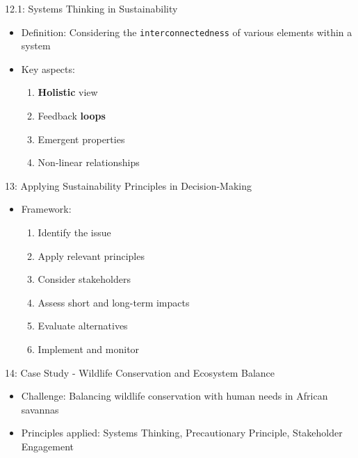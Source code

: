 \documentclass[
  ignorenonframetext,
]{beamer}
\providecommand{\tightlist}{%
  \setlength{\itemsep}{0pt}\setlength{\parskip}{0pt}}\usepackage{longtable,booktabs,array}
\begin{document}
\begin{frame}[fragile]{12.1: Systems Thinking in Sustainability}
\label{systems-thinking-in-sustainability}
\begin{itemize}
\tightlist
\item
  Definition: Considering the \texttt{interconnectedness} of various
  elements within a system
\item
  Key aspects:

  \begin{enumerate}
  \tightlist
  \item
    \textbf{Holistic} view
  \item
    Feedback \textbf{loops}
  \item
    Emergent properties
  \item
    Non-linear relationships
  \end{enumerate}
\end{itemize}
\end{frame}

\begin{frame}{13: Applying Sustainability Principles in Decision-Making}
\label{applying-sustainability-principles-in-decision-making}
\begin{itemize}
\tightlist
\item
  Framework:

  \begin{enumerate}
  \tightlist
  \item
    Identify the issue
  \item
    Apply relevant principles
  \item
    Consider stakeholders
  \item
    Assess short and long-term impacts
  \item
    Evaluate alternatives
  \item
    Implement and monitor
  \end{enumerate}
\end{itemize}
\end{frame}

\begin{frame}{14: Case Study - Wildlife Conservation and Ecosystem
Balance}
\label{case-study---wildlife-conservation-and-ecosystem-balance}
\begin{itemize}
\tightlist
\item
  Challenge: Balancing wildlife conservation with human needs in African
  savannas
\item
  Principles applied: Systems Thinking, Precautionary Principle,
  Stakeholder Engagement
\end{itemize}
\end{frame}
\end{document}
